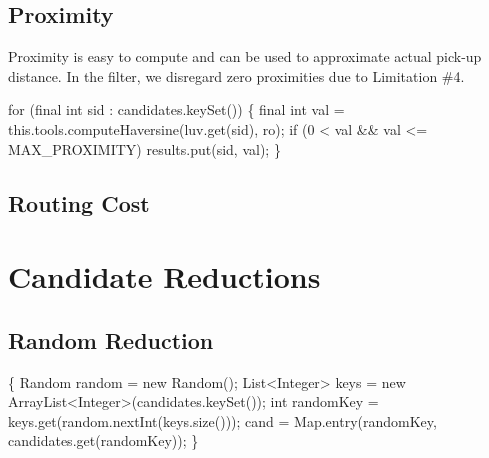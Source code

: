 \section{Proximity}

Proximity is easy to compute and can be used to approximate actual pick-up
distance. In the filter, we disregard zero proximities due to Limitation \#4.

\nwenddocs{}\endmoddef\nwstartdeflinemarkup{}\nwenddeflinemarkup
for (final int sid : candidates.keySet()) \{
  final int val = this.tools.computeHaversine(luv.get(sid), ro);
  if (0 < val && val <= MAX_PROXIMITY)
    results.put(sid, val);
\}
\nwendcode{}\nwdocspar


\section{Routing Cost}


\nwenddocs{}\chapter{Candidate Reductions}
\label{search-reductions}

\section{Random Reduction}

\nwenddocs{}\endmoddef\nwstartdeflinemarkup{}\nwenddeflinemarkup
\{
  Random random = new Random();
  List<Integer> keys = new ArrayList<Integer>(candidates.keySet());
  int randomKey = keys.get(random.nextInt(keys.size()));
  cand = Map.entry(randomKey, candidates.get(randomKey));
\}
\nwendcode{}\nwdocspar

